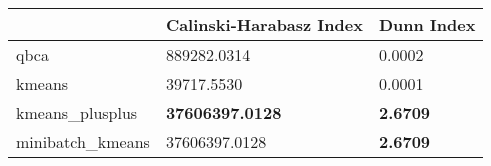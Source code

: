 \begin{table}[htbp]
\centering
\begin{tabular}{lll}
\toprule
 & Calinski-Harabasz Index & Dunn Index \\
\midrule
qbca & 889282.0314 & 0.0002 \\
kmeans & 39717.5530 & 0.0001 \\
kmeans_plusplus & \textbf{37606397.0128} & \textbf{2.6709} \\
minibatch_kmeans & 37606397.0128 & \textbf{2.6709} \\
\bottomrule
\end{tabular}
\end{table}
